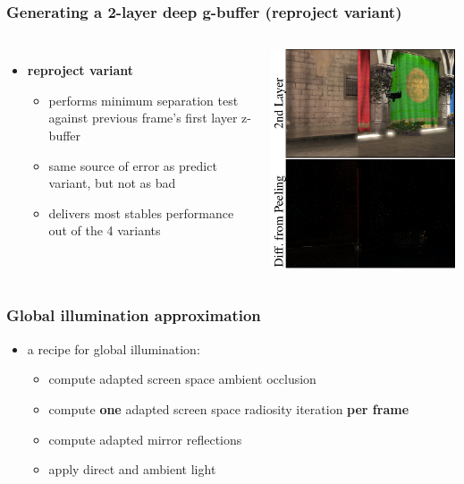 \documentclass[aspectratio=169]{beamer}
\begin{document}
	\begin{frame}
		\frametitle{Generating a 2-layer deep g-buffer (reproject variant)}
		\begin{columns}
				\begin{itemize}
					\item \textbf{reproject variant}
					\begin{itemize}
						\item performs minimum separation test against previous frame's first layer z-buffer
						\item same source of error as predict variant, but not as bad 
						\item delivers most stables performance out of the 4 variants
					\end{itemize}
				\end{itemize}
				\includegraphics[height=.9\textwidth]{img/reproject.png}
		\end{columns}
	\end{frame}	

	\begin{frame}
		\frametitle{Global illumination approximation}
		\begin{itemize}
			\item a recipe for global illumination:
				\begin{itemize}
					\item compute adapted screen space ambient occlusion 
					\item compute \textbf{one} adapted screen space radiosity iteration \textbf{per frame}
					\item compute adapted mirror reflections
					\item apply direct and ambient light
				\end{itemize}
		\end{itemize}
	\end{frame}	
\end{document}
